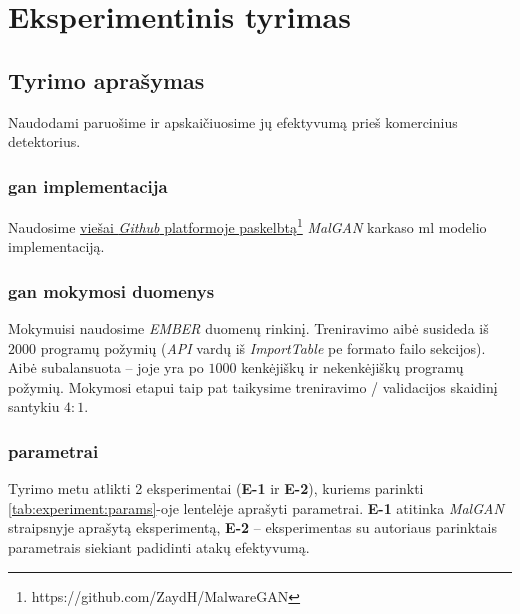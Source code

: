 \section{Eksperimentinis tyrimas}\label{sec:experiment}

\subsection{Tyrimo aprašymas}
Naudodami   paruošime
 ir apskaičiuosime jų efektyvumą prieš komercinius
detektorius.

\subsubsection{\acs{gan} implementacija} Naudosime \href{https://github.com/ZaydH/MalwareGAN}{viešai
    \textit{Github} platformoje
    paskelbtą\footnote{https://github.com/ZaydH/MalwareGAN}} \textit{MalGAN}
karkaso \acs{ml} modelio implementaciją.



\subsubsection{\acs{gan} mokymosi duomenys} Mokymuisi naudosime \textit{EMBER}
\cite{andersonEMBEROpenDataset2018a} duomenų rinkinį. Treniravimo aibė susideda
iš $2000$ programų požymių (\textit{API} vardų iš \textit{ImportTable} \acs{pe}
formato failo sekcijos). Aibė subalansuota -- joje yra po $1000$ kenkėjiškų ir
nekenkėjiškų programų požymių. Mokymosi etapui taip pat taikysime treniravimo /
validacijos skaidinį santykiu $4:1$.

\subsubsection{ parametrai}

Tyrimo metu atlikti 2 eksperimentai (\textbf{E-1} ir \textbf{E-2}), kuriems
parinkti \ref{tab:experiment:params}-oje lentelėje aprašyti parametrai.
\textbf{E-1} atitinka \textit{MalGAN} straipsnyje
\cite{huGeneratingAdversarialMalware2017} aprašytą eksperimentą, \textbf{E-2}
-- eksperimentas su autoriaus parinktais parametrais siekiant padidinti atakų
efektyvumą.

